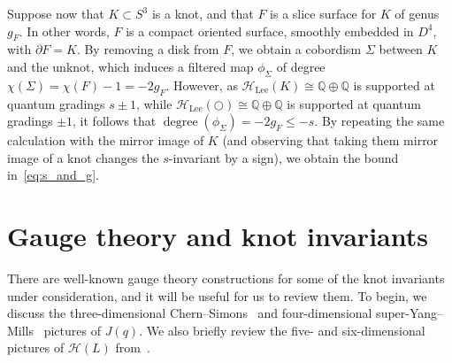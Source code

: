 \documentclass[11pt]{article}
\numberwithin{equation}{section}
\begin{document}
Suppose now that $K \subset S^3$ is a knot, and that $F$ is a slice surface for $K$ of genus $g_F$.
In other words, $F$ is a compact oriented surface, smoothly embedded in $D^4$, with $\partial F = K$.
By removing a disk from $F$, we obtain a cobordism $\Sigma$ between $K$ and the unknot, which induces a filtered map $\phi_\Sigma$ of degree $\chi(\Sigma) = \chi(F)-1 = -2g_F$.
However, as $\mathcal{H}_\text{Lee}(K) \cong \mathbb{Q} \oplus \mathbb{Q}$ is supported at quantum gradings $s \pm 1$, while $\mathcal{H}_\text{Lee}(\bigcirc) \cong \mathbb{Q} \oplus \mathbb{Q}$ is supported at quantum gradings $\pm 1$, it follows that $\operatorname{degree}(\phi_\Sigma) = -2g_F \leq -s$.
By repeating the same calculation with the mirror image of $K$ (and observing that taking them mirror image of a knot changes the $s$-invariant by a sign), we obtain the bound in~\eqref{eq:s_and_g}.


\section{Gauge theory and knot invariants}\label{sec:gauge-theory}
There are well-known gauge theory constructions for some of the knot invariants under consideration, and it will be useful for us to review them.
To begin, we discuss the three-dimensional Chern--Simons~\cite{Witten:1988hf} and four-dimensional super-Yang--Mills~\cite{Witten:2010zr,Gaiotto:2011nm,Witten:2011zz} pictures of $J(q)$. 
We also briefly review the five- and six-dimensional pictures of $\mathcal{H}(L)$ from~\cite{Witten:2011zz}.
\end{document}
